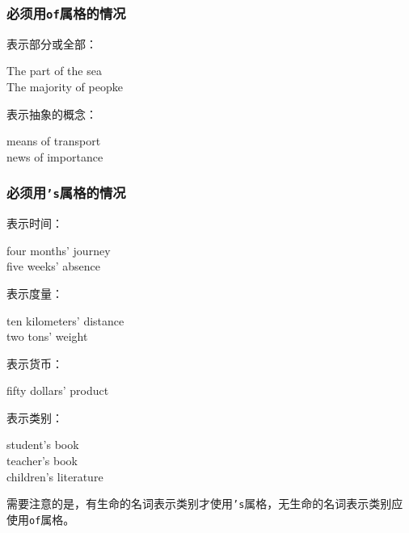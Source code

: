 \documentclass[UTF8]{ctexart}
\begin{document}
\subsubsection{必须用\texttt{\hspace{2pt}of}属格的情况}
    表示部分或全部：
    \begin{center}
        \ttfamily
        The part of the sea\\[3mm]
        The majority of peopke\\[6mm]
    \end{center}
    表示抽象的概念：
    \begin{center}
        \ttfamily
        means of transport\\[3mm]
        news of importance
    \end{center}

\subsubsection{必须用\texttt{\hspace{2pt}'s}属格的情况}
    表示时间：
    \begin{center}
        \ttfamily
        four months' journey\\[3mm]
        five weeks' absence\\[6mm]
    \end{center}
    表示度量：
    \begin{center}
        \ttfamily
        ten kilometers' distance\\[3mm]
        two tons' weight\\[6mm]
    \end{center}
    表示货币：
    \begin{center}
        \ttfamily
        fifty dollars' product\\[6mm]
    \end{center}
    表示类别：
    \begin{center}
        \ttfamily
        student's book\\[3mm]
        teacher's book\\[3mm]
        children's literature\\[6mm]
    \end{center}
    需要注意的是，有生命的名词表示类别才使用\texttt{\hspace{2pt}'s}属格，无生命的名词表示类别应使用\texttt{\hspace{2pt}of}属格。

\newpage
\end{document}

